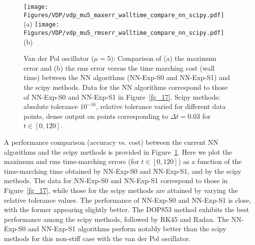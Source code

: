 \begin{figure}
  \centerline{
    \texttt{[image: Figures/VDP/vdp\_mu5\_maxerr\_walltime\_compare\_nn\_scipy.pdf]}(a)
    \texttt{[image: Figures/VDP/vdp\_mu5\_rmserr\_walltime\_compare\_nn\_scipy.pdf]}(b)
  }
  \caption{Van der Pol oscillator ($\mu=5$):
    Comparison of (a) the maximum error and (b) the rms error versus the time marching
    cost (wall time) between the NN algorithms (NN-Exp-S0 and NN-Exp-S1)
    and the scipy methods.
    Data for the NN algorithms correspond to those of NN-Exp-S0 and NN-Exp-S1 in
    Figure~\ref{fg_17}.
    Scipy methods: absolute tolerance $10^{-16}$,
    relative tolerance varied for different data points,
    dense output on points corresponding to $\Delta t=0.03$ for $t\in[0,120]$.
  }
  \label{fg_18}
\end{figure}

A performance comparison (accuracy vs. cost) between the current NN algorithms
and the scipy methods is provided in Figure~\ref{fg_18}.
Here we plot the maximum and rms time-marching errors (for $t\in[0,120]$)
as a function of the time-marching time obtained by 
NN-Exp-S0 and NN-Exp-S1, and by the scipy methods.
The data for NN-Exp-S0 and NN-Exp-S1 correspond to those in Figure~\ref{fg_17},
while those for the scipy methods are attained by varying the relative tolerance values.
The performance of NN-Exp-S0 and NN-Exp-S1 is close,
with the former appearing slightly better.
The DOP853 method exhibits the best performance among the scipy methods,
followed by RK45 and Radau.
The NN-Exp-S0 and NN-Exp-S1 algorithms perform notably better than
the scipy methods for this non-stiff case  with the van der Pol oscillator.


